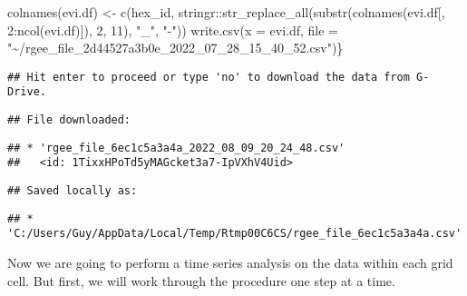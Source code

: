 \documentclass[
]{report}
\newenvironment{Shaded}{\begin{snugshade}}{\end{snugshade}}
\newcommand{\AttributeTok}[1]{\textcolor[rgb]{0.77,0.63,0.00}{#1}}
\newcommand{\DecValTok}[1]{\textcolor[rgb]{0.00,0.00,0.81}{#1}}
\newcommand{\FunctionTok}[1]{\textcolor[rgb]{0.00,0.00,0.00}{#1}}
\newcommand{\NormalTok}[1]{#1}
\newcommand{\OtherTok}[1]{\textcolor[rgb]{0.56,0.35,0.01}{#1}}
\newcommand{\SpecialCharTok}[1]{\textcolor[rgb]{0.00,0.00,0.00}{#1}}
\newcommand{\StringTok}[1]{\textcolor[rgb]{0.31,0.60,0.02}{#1}}
\begin{document}
\begin{Shaded}
\begin{Highlighting}[]
\FunctionTok{colnames}\NormalTok{(evi.df) }\OtherTok{\textless{}{-}} \FunctionTok{c}\NormalTok{(}\StringTok{\textquotesingle{}hex\_id\textquotesingle{}}\NormalTok{, stringr}\SpecialCharTok{::}\FunctionTok{str\_replace\_all}\NormalTok{(}\FunctionTok{substr}\NormalTok{(}\FunctionTok{colnames}\NormalTok{(evi.df[, }\DecValTok{2}\SpecialCharTok{:}\FunctionTok{ncol}\NormalTok{(evi.df)]), }\DecValTok{2}\NormalTok{, }\DecValTok{11}\NormalTok{), }\StringTok{"\_"}\NormalTok{, }\StringTok{"{-}"}\NormalTok{))}
\FunctionTok{write.csv}\NormalTok{(}\AttributeTok{x =}\NormalTok{ evi.df, }\AttributeTok{file =} \StringTok{"\textasciitilde{}/rgee\_file\_2d44527a3b0e\_2022\_07\_28\_15\_40\_52.csv"}\NormalTok{)\}}
\end{Highlighting}
\end{Shaded}

\begin{verbatim}
## Hit enter to proceed or type 'no' to download the data from G-Drive.
\end{verbatim}

\begin{verbatim}
## File downloaded:
\end{verbatim}

\begin{verbatim}
## * 'rgee_file_6ec1c5a3a4a_2022_08_09_20_24_48.csv'
##   <id: 1TixxHPoTd5yMAGcket3a7-IpVXhV4Uid>
\end{verbatim}

\begin{verbatim}
## Saved locally as:
\end{verbatim}

\begin{verbatim}
## * 'C:/Users/Guy/AppData/Local/Temp/Rtmp00C6CS/rgee_file_6ec1c5a3a4a.csv'
\end{verbatim}

Now we are going to perform a time series analysis on the data within
each grid cell. But first, we will work through the procedure one step
at a time.
\end{document}
